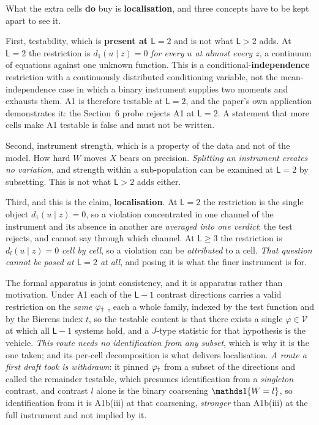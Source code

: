What the extra cells \textbf{do} buy is \textbf{localisation}, and three concepts have to be kept
apart to see it.

First, testability, which is \textbf{present at $\mathsf L=2$} and is not what $\mathsf L>2$ adds.
At $\mathsf L=2$ the restriction is $d_1(u\mid z)=0$ \emph{for every $u$ at almost every $z$}, a
continuum of equations against one unknown function. This is a conditional-\textbf{independence}
restriction with a continuously distributed conditioning variable, not the mean-independence case in
which a binary instrument supplies two moments and exhausts them. A1 is therefore testable at
$\mathsf L=2$, and the paper's own application demonstrates it: the Section~6 probe rejects A1 at
$\mathsf L=2$. A statement that more cells make A1 testable is false and must not be written.

Second, instrument strength, which is a property of the data and not of the model. How hard $W$
moves $X$ bears on precision. \emph{Splitting an instrument creates no variation}, and strength within a
sub-population can be examined at $\mathsf L=2$ by subsetting. This is not what $\mathsf L>2$ adds
either.

Third, and this is the claim, \textbf{localisation}. At $\mathsf L=2$ the restriction is the
single object $d_1(u\mid z)=0$, so a violation concentrated in one channel of the instrument and its
absence in another are \emph{averaged into one verdict}: the test rejects, and cannot say through which
channel. At $\mathsf L\ge3$ the restriction is $d_l(u\mid z)=0$ \emph{cell by cell}, so a violation can be
\emph{attributed} to a cell. \emph{That question cannot be posed at $\mathsf L=2$ at all}, and posing it
is what the finer instrument is for.

The formal apparatus is joint consistency, and it is apparatus rather than motivation. Under A1
each of the $\mathsf L-1$ contrast directions carries a valid restriction on the \emph{same} $\varphi_{\dagger}$
, each a whole family, indexed by the test function and by the Bierens index $t$, so the testable
content is that there exists a single $\varphi\in\mathcal V$ at which all $\mathsf L-1$ systems hold, and
a $J$-type statistic for that hypothesis is the vehicle. \emph{This route needs no identification from
any subset}, which is why it is the one taken; and its per-cell decomposition is what delivers
localisation. \emph{A route a first draft took is withdrawn}: it pinned $\varphi_{\dagger}$ from a subset of the
directions and called the remainder testable, which presumes identification from a \emph{singleton}
contrast, and contrast $l$ alone is the binary coarsening $\un\{W=l\}$, so identification from it is
A1b(iii) at that coarsening, \emph{stronger} than A1b(iii) at the full instrument and not implied by it.

